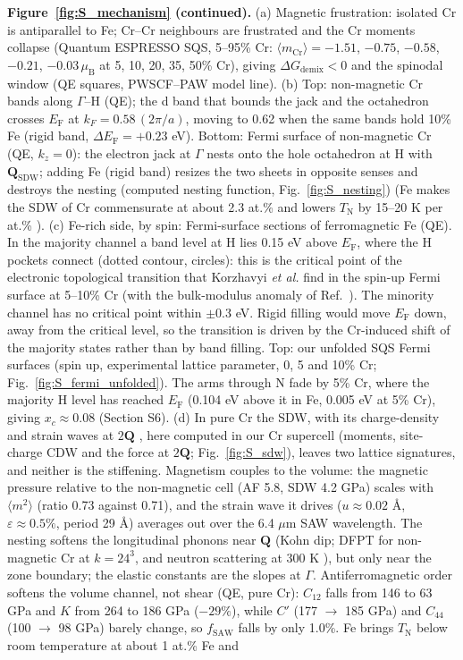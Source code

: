\documentclass[final,3p,times]{elsarticle}
\begin{document}
\clearpage
\noindent\textbf{Figure~\ref{fig:S_mechanism} (continued).} (a) Magnetic frustration: isolated Cr is antiparallel to Fe; Cr--Cr neighbours are frustrated and the Cr moments collapse (Quantum ESPRESSO SQS, 5--95\% Cr: $\langle m_{\mathrm{Cr}}\rangle=-1.51$, $-0.75$, $-0.58$, $-0.21$, $-0.03\,\mu_{\mathrm{B}}$ at 5, 10, 20, 35, 50\% Cr), giving $\Delta G_{\mathrm{demix}}<0$ and the spinodal window (QE squares, PWSCF--PAW model line). (b) Top: non-magnetic Cr bands along $\Gamma$--H (QE); the d band that bounds the jack and the octahedron crosses $E_{\mathrm F}$ at $k_F=0.58\,(2\pi/a)$, moving to 0.62 when the same bands hold 10\% Fe (rigid band, $\Delta E_{\mathrm F}=+0.23$ eV). Bottom: Fermi surface of non-magnetic Cr (QE, $k_z=0$): the electron jack at $\Gamma$ nests onto the hole octahedron at H with $\mathbf{Q}_{\mathrm{SDW}}$; adding Fe (rigid band) resizes the two sheets in opposite senses and destroys the nesting (computed nesting function, Fig.~\ref{fig:S_nesting}) (Fe makes the SDW of Cr commensurate at about 2.3 at.\% and lowers $T_{\mathrm N}$ by 15--20 K per at.\% \cite{fawcett1988spin}). (c) Fe-rich side, by spin: Fermi-surface sections of ferromagnetic Fe (QE). In the majority channel a band level at H lies 0.15 eV above $E_{\mathrm F}$, where the H pockets connect (dotted contour, circles): this is the critical point of the electronic topological transition that Korzhavyi \textit{et al.} find in the spin-up Fermi surface at 5--10\% Cr \cite{korzhavyi2009electronic} (with the bulk-modulus anomaly of Ref.~\cite{olsson2003abinitio}). The minority channel has no critical point within $\pm0.3$ eV. Rigid filling would move $E_{\mathrm F}$ down, away from the critical level, so the transition is driven by the Cr-induced shift of the majority states rather than by band filling. Top: our unfolded SQS Fermi surfaces (spin up, experimental lattice parameter, 0, 5 and 10\% Cr; Fig.~\ref{fig:S_fermi_unfolded}). The arms through N fade by 5\% Cr, where the majority H level has reached $E_{\mathrm F}$ (0.104 eV above it in Fe, 0.005 eV at 5\% Cr), giving $x_c\approx0.08$ (Section S6). (d) In pure Cr the SDW, with its charge-density and strain waves at $2\mathbf{Q}$ \cite{fawcett1988spin}, here computed in our Cr supercell (moments, site-charge CDW and the force at $2\mathbf{Q}$; Fig.~\ref{fig:S_sdw}), leaves two lattice signatures, and neither is the stiffening. Magnetism couples to the volume: the magnetic pressure relative to the non-magnetic cell (AF 5.8, SDW 4.2 GPa) scales with $\langle m^2\rangle$ (ratio 0.73 against 0.71), and the strain wave it drives ($u\approx0.02$ \AA, $\varepsilon\approx0.5\%$, period 29 \AA) averages out over the 6.4 $\mu$m SAW wavelength. The nesting softens the longitudinal phonons near $\mathbf{Q}$ (Kohn dip; DFPT for non-magnetic Cr at $k=24^3$, and neutron scattering at 300 K \cite{shaw1971investigation}), but only near the zone boundary; the elastic constants are the slopes at $\Gamma$. Antiferromagnetic order softens the volume channel, not shear (QE, pure Cr): $C_{12}$ falls from 146 to 63 GPa and $K$ from 264 to 186 GPa ($-29\%$), while $C'$ (177 $\to$ 185 GPa) and $C_{44}$ (100 $\to$ 98 GPa) barely change, so $f_{\mathrm{SAW}}$ falls by only 1.0\%. Fe brings $T_{\mathrm N}$ below room temperature at about 1 at.\% Fe and 
\end{document}
